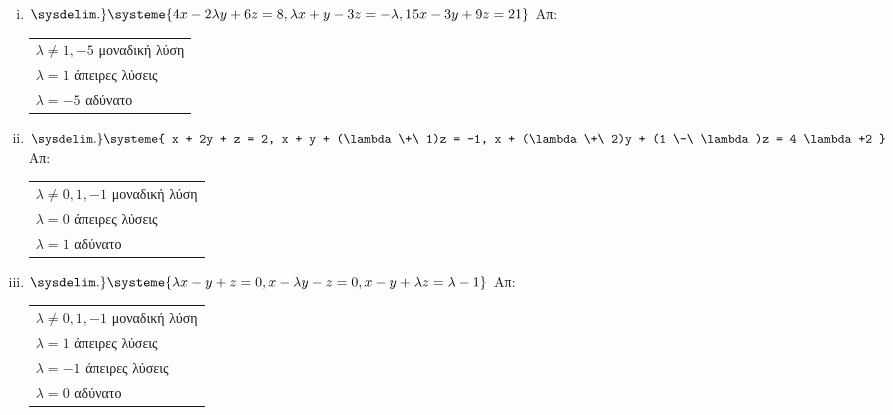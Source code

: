 \begin{enumerate}
	\begin{enumerate}[i)]
		\setlength{\itemsep}{\baselineskip}
\item $\sysdelim.\} \systeme{4x-2\lambda y + 6z = 8, \lambda x + y -3z = -\lambda, 15x -3y + 9z = 21}$ \hfill Απ: \begin{tabular}{l}
		$\lambda \neq 1,-5 $ μοναδική λύση \\
		$\lambda = 1 $ άπειρες λύσεις \\
		$\lambda =-5 $ αδύνατο
	\end{tabular}


\item $ \sysdelim.\} \systeme{
x + 2y + z = 2, 
x + y + (\lambda  \+\ 1)z = -1, 
x + (\lambda  \+\ 2)y + (1 \-\ \lambda)z = 4 \lambda +2
} $ \hfill Απ: \begin{tabular}{l}
	$ \lambda \neq 0, 1, -1 $ μοναδική λύση \\
	$ \lambda = 0 $ άπειρες λύσεις \\
	$ \lambda = 1 $ αδύνατο 
\end{tabular} 

\item $ \sysdelim.\} \systeme{
\lambda x - y + z = 0,
x - \lambda y - z = 0, 
x - y + \lambda z = \lambda - 1
} $ \hfill Απ: \begin{tabular}{l}
	$ \lambda \neq 0, 1, -1 $ μοναδική λύση \\
	$ \lambda = 1$ άπειρες λύσεις \\
	$ \lambda = -1 $ άπειρες λύσεις \\
	$ \lambda = 0 $ αδύνατο
\end{tabular} 

	\end{enumerate}

\end{enumerate}



